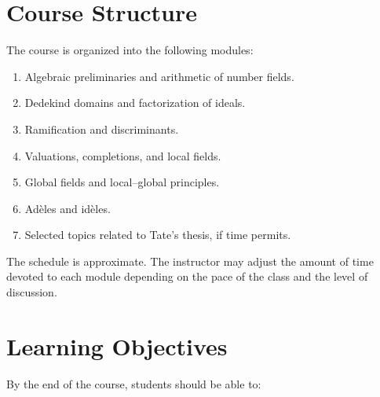 \documentclass[11pt]{article}
\begin{document}
\section{Course Structure}

The course is organized into the following modules:

\begin{enumerate}
    \item Algebraic preliminaries and arithmetic of number fields.
    \item Dedekind domains and factorization of ideals.
    \item Ramification and discriminants.
    \item Valuations, completions, and local fields.
    \item Global fields and local--global principles.
    \item Adèles and idèles.
    \item Selected topics related to Tate's thesis, if time permits.
\end{enumerate}

The schedule is approximate. The instructor may adjust the amount of time
devoted to each module depending on the pace of the class and the level of
discussion.

\section{Learning Objectives}

By the end of the course, students should be able to:
\end{document}
